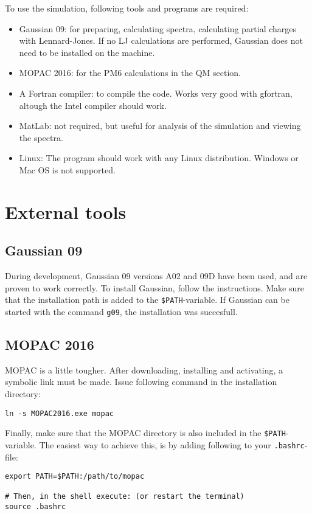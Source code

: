 To use the simulation, following tools and programs are required:
\begin{itemize}
	\item Gaussian 09: for preparing, calculating spectra, calculating partial 
	charges with Lennard-Jones. If no LJ calculations are performed, Gaussian 
	does not need to be installed on the machine.
	\item MOPAC 2016: for the PM6 calculations in the QM section.
	\item A Fortran compiler: to compile the code. Works very good with 
	gfortran, altough the Intel compiler should work.
	\item MatLab: not required, but useful for analysis of the simulation and 
	viewing the spectra.
	\item Linux: The program should work with any Linux distribution. Windows 
	or Mac OS is not supported.
\end{itemize}

\section{External tools}
\subsection{Gaussian 09}
During development, Gaussian 09\cite{g09} versions A02 and 09D have been used, 
and are 
proven to work correctly.
To install Gaussian, follow the instructions. Make sure that the installation 
path is added to the \verb|$PATH|-variable. If Gaussian can be started with the 
command \verb|g09|, the installation was succesfull.

\subsection{MOPAC 2016}
MOPAC\cite{mopac} is a little tougher. After downloading, installing and 
activating, a 
symbolic link must be made. Issue following command in the installation 
directory:

\begin{lstlisting}[caption=Symlink to MOPAC]
ln -s MOPAC2016.exe mopac
\end{lstlisting}

Finally, make sure that the MOPAC directory is also included in the 
\verb|$PATH|-variable. The easiest way to achieve this, is by adding following 
to your \verb|.bashrc|-file:
\begin{lstlisting}[caption=changing the path variable]
export PATH=$PATH:/path/to/mopac

# Then, in the shell execute: (or restart the terminal)
source .bashrc
\end{lstlisting}

